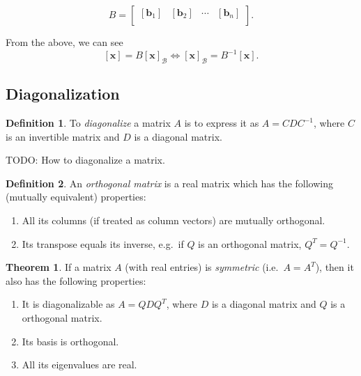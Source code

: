 \documentclass[10pt]{scrartcl}
\numberwithin{equation}{subsection}
\theoremstyle{definition}
\newtheorem{definition}{Definition}[section]
\newtheorem{theorem}{Theorem}[section]
\theoremstyle{remark}
\newenvironment{definitionSR}
{
\begin{siderules}
\begin{definition}
}
{
\end{definition}
\end{siderules}
}
\newenvironment{theoremSR}
{
\begin{siderules}
\begin{theorem}
}
{
\end{theorem}
\end{siderules}
}
\newcommand{\ve}[1]{
	\mathbf{#1}
}
\newcommand{\cvb}[1]{
	[\mathbf{#1}]
}
\newcommand{\inv}[1]{
	{#1}^{-1}
}
\begin{document}
\begin{equation}
B = \begin{bmatrix} 
[\ve{b}_1]&[\ve{b}_2]& \cdots & [\ve{b}_n]\\

\end{bmatrix}.
\end{equation}

From the above, we can see
\begin{equation}
\cvb{x} = B\cvb{x}_\mathcal{B} \iff \cvb{x}_\mathcal{B} = \inv{B}\cvb{x}.
\end{equation}

\subsection{Diagonalization}
\begin{definitionSR}
To \textit{diagonalize} a matrix $A$ is to express it as $A=CD\inv{C}$, where
$C$ is an invertible matrix and $D$ is a diagonal matrix.
\end{definitionSR}
TODO: How to diagonalize a matrix.

\begin{definitionSR}
An \textit{orthogonal matrix} is a real matrix which has the following (mutually equivalent) properties:
\begin{enumerate}
\item All its columns (if treated as column vectors) are mutually orthogonal.
\item Its transpose equals its inverse, e.g.\ if $Q$ is an orthogonal matrix, $Q^T = \inv{Q}$.
\end{enumerate}

\end{definitionSR}

\begin{theoremSR}
	If a matrix $A$ (with real entries) is \textit{symmetric} (i.e.\ $A =
	A^T$), then it also has the following properties:
	\begin{enumerate}
	\item It is diagonalizable as $A=QDQ^T$, where $D$ is a diagonal matrix and $Q$ is a orthogonal matrix.
	\item Its basis is orthogonal.
	\item All its eigenvalues are real.
	\end{enumerate}
\end{theoremSR}
\end{document}
